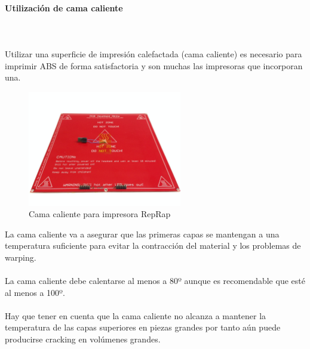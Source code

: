 \documentclass[11pt,a4paper]{article}
\begin{document}
			\paragraph{Utilización de cama caliente}\mbox{}\\\\
Utilizar una superficie de impresión calefactada (cama caliente) es necesario para imprimir ABS de forma satisfactoria y son muchas las impresoras que incorporan una.
\begin{figure}[H]
\centering
\includegraphics[width=0.6\textwidth,cfbox=azul_marcos 4pt 0pt]{FOTOS/HEATEDBED}
\caption*{Cama caliente para impresora RepRap}
\end{figure}
La cama caliente va a asegurar que las primeras capas se mantengan a una temperatura suficiente para evitar la contracción del material y los problemas de warping.
\\\\
La cama caliente debe calentarse al menos a 80º aunque es recomendable que esté al menos a 100º.
\\\\
Hay que tener en cuenta que la cama caliente no alcanza a mantener la temperatura de las capas superiores en piezas grandes por tanto aún puede producirse cracking en volúmenes grandes.
\end{document}
